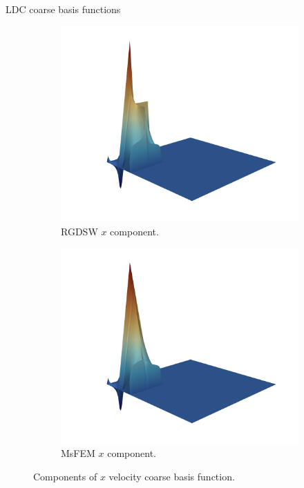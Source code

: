 \begin{frame}{LDC coarse basis functions}
	\begin{figure}
		\centering
		\begin{subfigure}{0.5\textwidth}
			\includegraphics[width=\textwidth]{images/RGDSW-x}
			\caption{RGDSW $x$ component.}
		\end{subfigure}%
		\begin{subfigure}{0.5\textwidth}
			\includegraphics[width=\textwidth]{images/MsFEM-x}
			\caption{MsFEM $x$ component.}
		\end{subfigure}
		\caption{Components of $x$ velocity coarse basis function.}
	\end{figure}
\end{frame}

